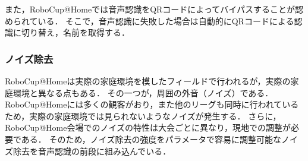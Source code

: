 \documentclass[a4j]{jarticle}
\begin{document}
また，RoboCup@Homeでは音声認識をQRコードによってバイパスすることが認められている．
そこで，音声認識に失敗した場合は自動的にQRコードによる認識に切り替え，名前を取得する．


\subsubsection{ノイズ除去}
RoboCup@Homeは実際の家庭環境を模したフィールドで行われるが，実際の家庭環境と異なる点もある．
その一つが，周囲の外音（ノイズ）である．
RoboCup@Homeには多くの観客がおり，また他のリーグも同時に行われているため，実際の家庭環境では見られないようなノイズが発生する．
さらに，RoboCup@Home会場でのノイズの特性は大会ごとに異なり，現地での調整が必要である．
そのため，ノイズ除去の強度をパラメータで容易に調整可能なノイズ除去\cite{sainburg2020finding}を音声認識の前段に組み込んでいる．
\end{document}
